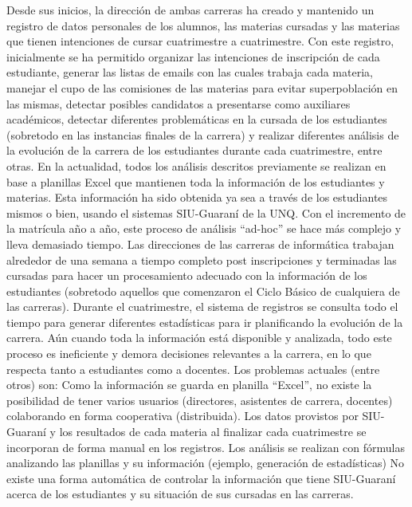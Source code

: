 Desde sus inicios, la dirección de ambas carreras ha creado y mantenido un registro de datos personales de los alumnos, las materias cursadas y las materias que tienen intenciones de cursar cuatrimestre a cuatrimestre. Con este registro, inicialmente se ha permitido organizar las intenciones de inscripción de cada estudiante, generar las listas de emails con las cuales trabaja cada materia, manejar el cupo de las comisiones de las materias para evitar superpoblación en las mismas, detectar posibles candidatos a presentarse como auxiliares académicos, detectar diferentes problemáticas en la cursada de los estudiantes (sobretodo en las instancias finales de la carrera) y realizar diferentes análisis de la evolución de la carrera de los estudiantes durante cada cuatrimestre, entre otras.
En la actualidad, todos los análisis descritos previamente se realizan en base a planillas Excel que mantienen toda la información de los estudiantes y materias. Esta información ha sido obtenida ya sea a través de los estudiantes mismos o bien, usando el sistemas SIU-Guaraní de la UNQ.
Con el incremento de la matrícula año a año, este proceso de análisis “ad-hoc” se hace más complejo y lleva demasiado tiempo. Las direcciones de las carreras de informática trabajan alrededor de una semana a tiempo completo post inscripciones y terminadas las cursadas para hacer un procesamiento adecuado con  la información de los estudiantes (sobretodo aquellos que comenzaron el Ciclo Básico de cualquiera de las carreras). Durante el cuatrimestre, el sistema de registros se consulta todo el tiempo para generar diferentes estadísticas para ir planificando la evolución de la carrera. Aún cuando toda la información está disponible y analizada, todo este proceso es ineficiente y demora decisiones relevantes a la carrera, en lo que respecta tanto a estudiantes como a docentes. Los problemas actuales (entre otros) son:
Como la información se guarda en planilla “Excel”, no existe la posibilidad de tener varios usuarios (directores, asistentes de carrera, docentes) colaborando en forma cooperativa (distribuida).
Los datos provistos por SIU-Guaraní y los resultados de cada materia al finalizar cada cuatrimestre se incorporan de forma manual en los registros.
Los análisis se realizan con fórmulas analizando las planillas y su información (ejemplo, generación de estadísticas)
No existe una forma automática de controlar la información que tiene SIU-Guaraní acerca de los estudiantes y su situación de sus cursadas en las carreras.


